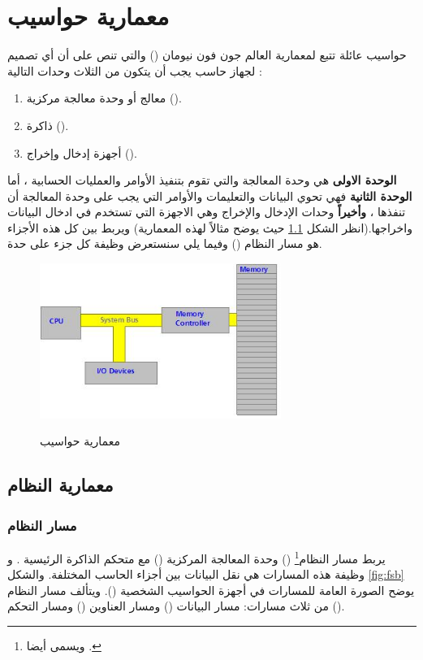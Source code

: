 \documentclass[document.tex]{subfiles}
\begin{document}
\chapter{معمارية حواسيب }
حواسيب عائلة  تتبع لمعمارية العالم جون فون نيومان () والتي تنص على أن أي تصميم لجهاز حاسب يجب أن يتكون من الثلاث وحدات التالية :
\begin{enumerate}
\item معالج أو وحدة معالجة مركزية ().
\item ذاكرة ().
\item أجهزة إدخال وإخراج ().
\end{enumerate}

\textbf{الوحدة الاولى} هي وحدة المعالجة والتي تقوم بتنفيذ الأوامر والعمليات الحسابية ، أما \textbf{الوحدة الثانية} فهي تحوي البيانات والتعليمات والأوامر التي يجب على وحدة المعالجة أن تنفذها ، \textbf{وأخيراً} وحدات الإدخال والإخراج وهي الاجهزة التي تستخدم في ادخال البيانات واخراجها.(انظر الشكل \ref{fig:vonarch} حيث يوضح مثالاً لهذه المعمارية) ويربط بين كل هذه الأجزاء هو مسار النظام () وفيما يلي سنستعرض وظيفة كل جزء على حدة.

\begin{figure}[h!]
  \caption{معمارية حواسيب }
  \centering
   \includegraphics[width=0.7\textwidth]{../img/vonarch}
 \label{fig:vonarch} 
\end{figure}

\section{معمارية النظام}
\subsection{مسار النظام }
يربط مسار النظام\footnote{ويسمى أيضا .}  () وحدة المعالجة المركزية () مع متحكم الذاكرة الرئيسية . و وظيفة هذه المسارات هي نقل البيانات بين أجزاء الحاسب المختلفة. والشكل \ref{fig:fsb} يوضح الصورة العامة للمسارات في أجهزة الحواسيب الشخصية (). ويتألف مسار النظام من ثلاث مسارات: مسار البيانات () ومسار العناوين () ومسار التحكم ().
\end{document}
